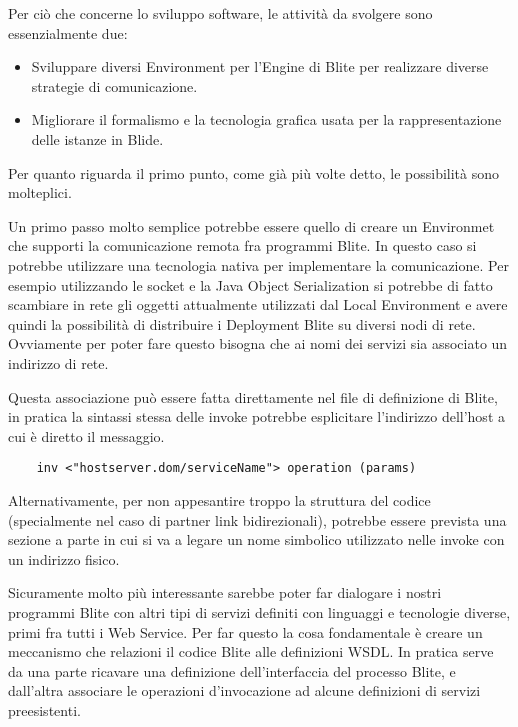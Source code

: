Per ciò che concerne lo sviluppo software, le attività da svolgere sono
essenzialmente due:

\begin{itemize}
  \item Sviluppare diversi Environment per l'Engine di Blite per realizzare
  diverse strategie di comunicazione.
  \item Migliorare il formalismo e la tecnologia grafica usata per la
  rappresentazione delle istanze in Blide.
\end{itemize} 

Per quanto riguarda il primo punto, come già più volte detto, le possibilità
sono molteplici. 

Un primo passo molto semplice potrebbe essere quello di creare un Environmet
che supporti la comunicazione remota fra programmi Blite. In questo caso si
potrebbe utilizzare una tecnologia nativa per implementare la comunicazione. Per
esempio utilizzando le socket e la Java Object Serialization si potrebbe di
fatto scambiare in rete gli oggetti attualmente utilizzati dal Local
Environment e avere quindi la possibilità di
distribuire i Deployment Blite su diversi nodi di rete. Ovviamente per poter
fare questo bisogna che ai nomi dei servizi sia associato un indirizzo di rete.

Questa associazione può essere fatta direttamente nel file di definizione di
Blite, in pratica la sintassi stessa delle invoke potrebbe esplicitare
l'indirizzo dell'host a cui è diretto il messaggio.

\begin{verbatim}
    inv <"hostserver.dom/serviceName"> operation (params) 
\end{verbatim}

Alternativamente, per non appesantire troppo la struttura del codice
(specialmente nel caso di partner link bidirezionali), potrebbe essere prevista
una sezione a parte in cui si va a legare un nome simbolico utilizzato nelle invoke con un
indirizzo fisico.

Sicuramente molto più interessante sarebbe poter far dialogare i nostri programmi
Blite con altri tipi di servizi definiti con linguaggi e tecnologie diverse,
primi fra tutti i Web Service. Per far questo la cosa fondamentale è creare
un meccanismo che relazioni il codice Blite alle definizioni WSDL. In pratica
serve da una parte ricavare una definizione dell'interfaccia del processo Blite,
e dall'altra associare le operazioni d'invocazione ad alcune definizioni di
servizi preesistenti.

